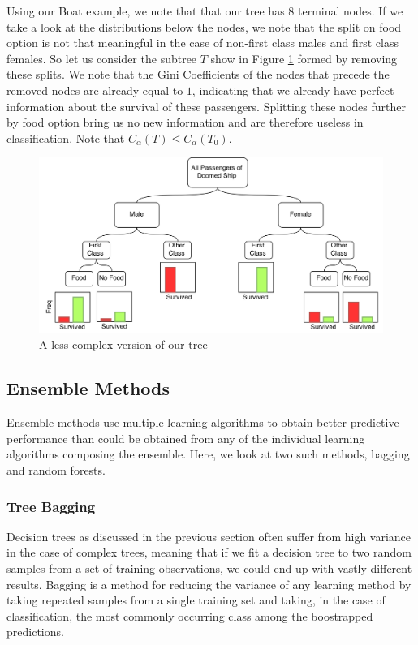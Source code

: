 \documentclass[preprint,12pt]{elsarticle}
\begin{document}
Using our Boat example, we note that that our tree has 8 terminal nodes. If we take a look at the distributions below the nodes, we note that the split on food option is not that meaningful in the case of non-first class males and first class females. So let us consider the subtree $T$ show in Figure \ref{fig:Pruned} formed by removing these splits. We note that the Gini Coefficients of the nodes that precede the removed nodes are already equal to $1$, indicating that we already have perfect information about the survival of these passengers. Splitting these nodes further by food option bring us no new information and are therefore useless in classification.
Note that $C_{\alpha}(T) \leq C_{\alpha}(T_{0})$.

\begin{figure}[h]
	\centering
	\includegraphics[width=1\textwidth]{PrunedBoat}
	\caption{A less complex version of our tree}
	\label{fig:Pruned}
\end{figure}

\subsection{Ensemble Methods}
Ensemble methods use multiple learning algorithms to obtain better predictive performance than could be obtained from any of the individual learning algorithms composing the ensemble. Here, we look at two such methods, bagging and random forests.


\subsubsection{Tree Bagging}
Decision trees as discussed in the previous section often suffer from high variance in the case of complex trees, meaning that if we fit a decision tree to two random samples from a set of training observations, we could end up with vastly different results. Bagging is a method for reducing the variance of any learning method by taking repeated samples from a single training set and taking, in the case of classification, the most commonly occurring class among the boostrapped predictions. 
\end{document}
